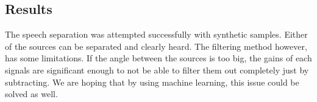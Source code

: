 \subsection*{Results} 
The speech separation was attempted successfully with synthetic samples. Either of 
the sources can be separated and clearly heard. The filtering method however, has 
some limitations. If the angle between the sources is too big, the gains of each 
signals are significant enough to not be able to filter them out completely just 
by subtracting. We are hoping that by using machine learning, this issue could be 
solved as well.